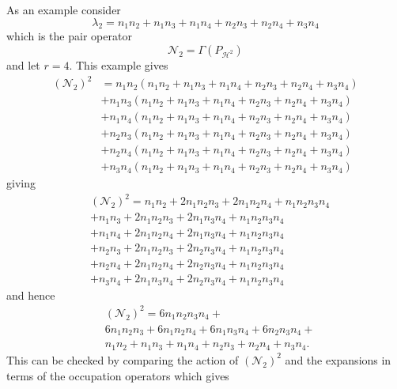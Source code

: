 \documentclass[aps,preprint]{revtex4}%
\begin{document}
As an example consider
\[
\lambda_{2}=n_{1}n_{2}+n_{1}n_{3}+n_{1}n_{4}+n_{2}n_{3}+n_{2}n_{4}+n_{3}n_{4}%
\]
which is the pair operator
\[
\mathcal{N}_{2}=\Gamma\left(  P_{\mathcal{H}^{2}}\right)
\]
and let $r=4.$ This example gives
\begin{align*}
\left(  \mathcal{N}_{2}\right)  ^{2}  &  =n_{1}n_{2}\left(  n_{1}n_{2}%
+n_{1}n_{3}+n_{1}n_{4}+n_{2}n_{3}+n_{2}n_{4}+n_{3}n_{4}\right) \\
&  +n_{1}n_{3}\left(  n_{1}n_{2}+n_{1}n_{3}+n_{1}n_{4}+n_{2}n_{3}+n_{2}%
n_{4}+n_{3}n_{4}\right) \\
&  +n_{1}n_{4}\left(  n_{1}n_{2}+n_{1}n_{3}+n_{1}n_{4}+n_{2}n_{3}+n_{2}%
n_{4}+n_{3}n_{4}\right) \\
&  +n_{2}n_{3}\left(  n_{1}n_{2}+n_{1}n_{3}+n_{1}n_{4}+n_{2}n_{3}+n_{2}%
n_{4}+n_{3}n_{4}\right) \\
&  +n_{2}n_{4}\left(  n_{1}n_{2}+n_{1}n_{3}+n_{1}n_{4}+n_{2}n_{3}+n_{2}%
n_{4}+n_{3}n_{4}\right) \\
&  +n_{3}n_{4}\left(  n_{1}n_{2}+n_{1}n_{3}+n_{1}n_{4}+n_{2}n_{3}+n_{2}%
n_{4}+n_{3}n_{4}\right)
\end{align*}
giving
\begin{align*}
&  \left(  \mathcal{N}_{2}\right)  ^{2}=n_{1}n_{2}+2n_{1}n_{2}n_{3}%
+2n_{1}n_{2}n_{4}+n_{1}n_{2}n_{3}n_{4}\\
&  +n_{1}n_{3}+2n_{1}n_{2}n_{3}+2n_{1}n_{3}n_{4}+n_{1}n_{2}n_{3}n_{4}\\
&  +n_{1}n_{4}+2n_{1}n_{2}n_{4}+2n_{1}n_{3}n_{4}+n_{1}n_{2}n_{3}n_{4}\\
&  +n_{2}n_{3}+2n_{1}n_{2}n_{3}+2n_{2}n_{3}n_{4}+n_{1}n_{2}n_{3}n_{4}\\
&  +n_{2}n_{4}+2n_{1}n_{2}n_{4}+2n_{2}n_{3}n_{4}+n_{1}n_{2}n_{3}n_{4}\\
&  +n_{3}n_{4}+2n_{1}n_{3}n_{4}+2n_{2}n_{3}n_{4}+n_{1}n_{2}n_{3}n_{4}%
\end{align*}
and hence%
\begin{align*}
&  \left(  \mathcal{N}_{2}\right)  ^{2}=6n_{1}n_{2}n_{3}n_{4}+\\
&  6n_{1}n_{2}n_{3}+6n_{1}n_{2}n_{4}+6n_{1}n_{3}n_{4}+6n_{2}n_{3}n_{4}+\\
&  n_{1}n_{2}+n_{1}n_{3}+n_{1}n_{4}+n_{2}n_{3}+n_{2}n_{4}+n_{3}n_{4}.
\end{align*}
This can be checked by comparing the action of $\left(  \mathcal{N}%
_{2}\right)  ^{2}$ and the expansions in terms of the occupation operators
which gives
\end{document}
